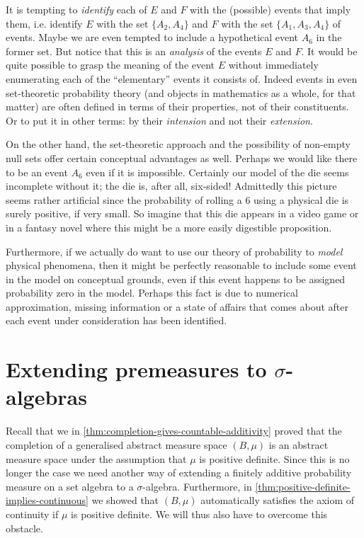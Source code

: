 \documentclass[article, a4paper, 11pt, oneside]{memoir}
\numberwithin{equation}{chapter}
\begin{document}
It is tempting to \emph{identify} each of $E$ and $F$ with the (possible) events that imply them, i.e. identify $E$ with the set $\{A_2, A_4\}$ and $F$ with the set $\{A_1, A_3, A_4\}$ of events. Maybe we are even tempted to include a hypothetical event $A_6$ in the former set. But notice that this is an \emph{analysis} of the events $E$ and $F$. It would be quite possible to grasp the meaning of the event $E$ without immediately enumerating each of the \enquote{elementary} events it consists of. Indeed events in even set-theoretic probability theory (and objects in mathematics as a whole, for that matter) are often defined in terms of their properties, not of their constituents. Or to put it in other terms: by their \emph{intension} and not their \emph{extension}.

On the other hand, the set-theoretic approach and the possibility of non-empty null sets offer certain conceptual advantages as well. Perhaps we would like there to be an event $A_6$ even if it is impossible. Certainly our model of the die seems incomplete without it; the die is, after all, six-sided! Admittedly this picture seems rather artificial since the probability of rolling a $6$ using a physical die is surely positive, if very small. So imagine that this die appears in a video game or in a fantasy novel where this might be a more easily digestible proposition.

Furthermore, if we actually do want to use our theory of probability to \emph{model} physical phenomena, then it might be perfectly reasonable to include some event in the model on conceptual grounds, even if this event happens to be assigned probability zero in the model. Perhaps this fact is due to numerical approximation, missing information or a state of affairs that comes about after each event under consideration has been identified.


\section[Extending premeasures to sigma-algebras][Extending premeasures to $\sigma$-algebras]{Extending premeasures to $\sigma$-algebras}

Recall that we in \cref{thm:completion-gives-countable-additivity} proved that the completion of a generalised abstract measure space $(B,\mu)$ is an abstract measure space under the assumption that $\mu$ is positive definite. Since this is no longer the case we need another way of extending a finitely additive probability measure on a set algebra to a $\sigma$-algebra. Furthermore, in \cref{thm:positive-definite-implies-continuous} we showed that $(B,\mu)$ automatically satisfies the axiom of continuity if $\mu$ is positive definite. We will thus also have to overcome this obstacle.
\end{document}
